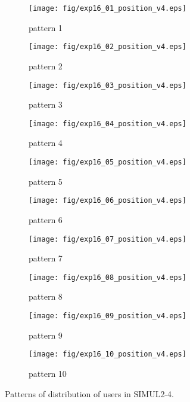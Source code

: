 \begin{figure}
	\begin{center}
		\begin{subfigure}[b]{0.32\textwidth}
			\texttt{[image: fig/exp16\_01\_position\_v4.eps]}
			\caption{pattern 1}
			\label{figure:simul2_4_a}
		\end{subfigure}
		\begin{subfigure}[b]{0.32\textwidth}
			\texttt{[image: fig/exp16\_02\_position\_v4.eps]}
			\caption{pattern 2}
			\label{figure:simul2_4_b}
		\end{subfigure}
		\begin{subfigure}[b]{0.32\textwidth}
			\texttt{[image: fig/exp16\_03\_position\_v4.eps]}
			\caption{pattern 3}
			\label{figure:simul2_4_c}
		\end{subfigure}
		\begin{subfigure}[b]{0.32\textwidth}
			\texttt{[image: fig/exp16\_04\_position\_v4.eps]}
			\caption{pattern 4}
			\label{figure:simul2_4_d}
		\end{subfigure}
		\begin{subfigure}[b]{0.32\textwidth}
			\texttt{[image: fig/exp16\_05\_position\_v4.eps]}
			\caption{pattern 5}
			\label{figure:simul2_4_e}
		\end{subfigure}
		\begin{subfigure}[b]{0.32\textwidth}
			\texttt{[image: fig/exp16\_06\_position\_v4.eps]}
			\caption{pattern 6}
			\label{figure:simul2_4_f}
		\end{subfigure}
		\begin{subfigure}[b]{0.32\textwidth}
			\texttt{[image: fig/exp16\_07\_position\_v4.eps]}
			\caption{pattern 7}
			\label{figure:simul2_4_g}
		\end{subfigure}
		\begin{subfigure}[b]{0.32\textwidth}
			\texttt{[image: fig/exp16\_08\_position\_v4.eps]}
			\caption{pattern 8}
			\label{figure:simul2_4_h}
		\end{subfigure}
		\begin{subfigure}[b]{0.32\textwidth}
			\texttt{[image: fig/exp16\_09\_position\_v4.eps]}
			\caption{pattern 9}
			\label{figure:simul2_4_i}
		\end{subfigure}
		\begin{subfigure}[b]{0.32\textwidth}
			\texttt{[image: fig/exp16\_10\_position\_v4.eps]}
			\caption{pattern 10}
			\label{figure:simul2_4_j}
		\end{subfigure}
		\caption{Patterns of distribution of users in SIMUL2-4.}
		\label{figure:simul2_4_p}
	\end{center}
\end{figure}

